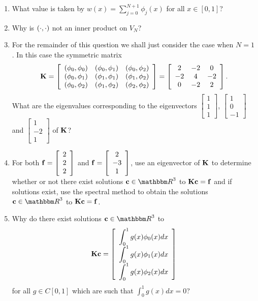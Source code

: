 \begin{enumerate}
\item What value is taken by $\displaystyle{w(x)=\sum_{j=0}^{N+1}\phi_j(x)}$ for all $x\in[0,1]$?

\item Why is $(\cdot,\cdot)$ not an inner product on $V_N$?

\item For the remainder of this question we shall just consider the case when $N=1$. In this case the symmetric matrix
       \[ {\bf K} = \left[\begin{array}{ccc}(\phi_0,\phi_0) & (\phi_0,\phi_1) & (\phi_0,\phi_2) \\ (\phi_0,\phi_1) & (\phi_1,\phi_1) & (\phi_1,\phi_2) \\ (\phi_0,\phi_2) & (\phi_1,\phi_2) & (\phi_2,\phi_2)\end{array}\right]=\left[\begin{array}{ccc}2 & -2 & 0 \\ -2 & 4 & -2 \\ 0 & -2 & 2\end{array}\right].\]
What are the eigenvalues corresponding to the eigenvectors $\left[\begin{array}{c}1 \\ 1 \\ 1\end{array}\right]$, $\left[\begin{array}{c}1 \\ 0 \\ -1\end{array}\right]$ and $\left[\begin{array}{c}1 \\ -2 \\ 1\end{array}\right]$ of ${\bf K}$?

\item For both ${\bf f} = \left[\begin{array}{c}2 \\ 2 \\ 2\end{array}\right]$ and ${\bf f} = \left[\begin{array}{c}2 \\ -3 \\ 1\end{array}\right]$, use an eigenvector of ${\bf K}$ to determine whether or not there exist solutions $\Bc\in\R^3$ to ${\bf K}{\bf c}={\bf f}$ and if solutions exist, use the spectral method to obtain the solutions $\Bc\in\R^3$ to ${\bf K}{\bf c}={\bf f}$.
 
\item Why do there exist solutions $\Bc\in\R^3$ to
\[
{\bf K}{\bf c}=\left[\begin{array}{c}\displaystyle{\int_0^1g(x)\phi_0(x)dx} \\ \displaystyle{\int_0^1g(x)\phi_1(x)dx} \\ \displaystyle{\int_0^1g(x)\phi_2(x)dx}\end{array}\right]
\]
for all $g\in C[0,1]$ which are such that $\displaystyle{\int_0^1g(x)dx=0}$?

\end{enumerate}



